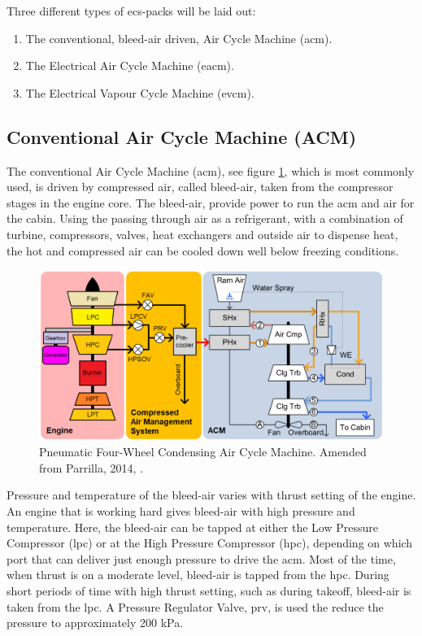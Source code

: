 \documentclass[english]{kththesis}
\begin{document}
Three different types of \acrshort{ecs}-packs will be laid out:

\begin{enumerate}
\item The conventional, bleed-air driven, Air Cycle Machine (\acrshort{acm}).
\item The Electrical Air Cycle Machine (\acrshort{eacm}).
\item The Electrical Vapour Cycle Machine (\acrshort{evcm}).
\end{enumerate} 

\subsection{Conventional Air Cycle Machine (ACM)}
\label{subsec:ConvACM}
The conventional Air Cycle Machine (\acrshort{acm}), see figure \ref{fig:ACM}, which is most commonly used, is driven by compressed air, called bleed-air, taken from the compressor stages in the engine core. The bleed-air, provide power to run the \acrshort{acm} and air for the cabin. Using the passing through air as a refrigerant, with a combination of turbine, compressors, valves, heat exchangers and outside air to dispense heat, the hot and compressed air can be cooled down well below freezing conditions.

\begin{figure}[!ht]
    \centering
    \includegraphics[width=1\textwidth]{Epictures/Pneumatic Bootstrap Four-Wheel Condensing ACM.png}
    \caption{Pneumatic Four-Wheel Condensing Air Cycle Machine. Amended from Parrilla, 2014, \cite{Parrilla2014}.}
    \label{fig:ACM}
\end{figure}

Pressure and temperature of the bleed-air varies with thrust setting of the engine. An engine that is working hard gives bleed-air with high pressure and temperature. Here, the bleed-air can be tapped at either the Low Pressure Compressor (\acrshort{lpc}) or at the High Pressure Compressor (\acrshort{hpc}), depending on   which port that can deliver just enough pressure to drive the \acrshort{acm}. Most of the time, when thrust is on a moderate level, bleed-air is tapped from the \acrshort{hpc}. During short periods of time with high thrust setting, such as during takeoff, bleed-air is taken from the \acrshort{lpc}. A Pressure Regulator Valve, \acrshort{prv}, is used the reduce the pressure to approximately 200 kPa.
\end{document}
